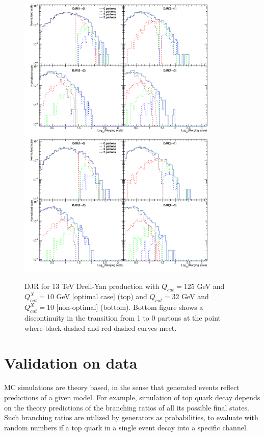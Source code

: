 \begin{figure}[!Hhtbp]
  \begin{center}
    \includegraphics[width=0.85\textwidth]{figs/DJR_q25_xq10_DYJets13TeV.png}
    \includegraphics[width=0.85\textwidth]{figs/DJR_q32_xq10_DYJets13TeV.png}
    \caption{DJR for 13 TeV Drell-Yan production with $Q_{cut}=125$ GeV and $Q^{X}_{cut}=10$ GeV [optimal case] (top) and $Q_{cut}=32$ GeV and $Q^{X}_{cut}=10$ [non-optimal] (bottom). Bottom figure shows a discontinuity in the transition from 1 to 0 partons at the point where black-dashed and red-dashed curves meet.}
    \label{fig:DYMerging}
  \end{center}
\end{figure}

\section{Validation on data}
\label{sec:val}

MC simulations are theory based, in the sense that generated events reflect predictions of a given model. For example, simulation of top quark decay depends on the theory predictions of the branching ratios of all its possible final states. Such branching ratios are utilized by generators as probabilities, to evaluate with random numbers if a top quark in a single event decay into a specific channel. 

